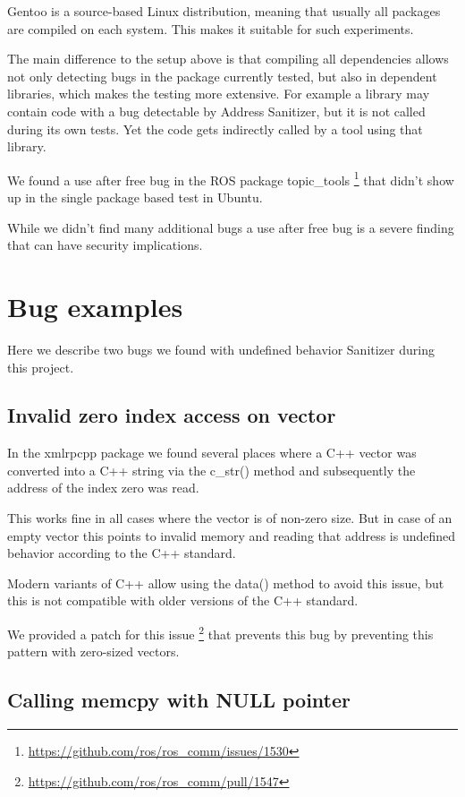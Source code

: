 \documentclass{article}
\begin{document}
Gentoo is a source-based Linux distribution, meaning that usually all packages are compiled on each system.
This makes it suitable for such experiments.

The main difference to the setup above is that compiling all dependencies allows not only detecting
bugs in the package currently tested, but also in dependent libraries, which makes the testing
more extensive. For example a library may contain
code with a bug detectable by Address Sanitizer, but it is not called during its own tests. Yet the
code gets indirectly called by a tool using that library.

We found a use after free bug in the ROS package topic\_tools
\footnote{\url{https://github.com/ros/ros_comm/issues/1530}}
that didn't show up in the
single package based test
in Ubuntu.

While we didn't find many additional bugs a use after free bug is a severe finding that can have
security implications.

\section{Bug examples}

Here we describe two bugs we found with undefined behavior Sanitizer during this project.

\subsection{Invalid zero index access on vector}

In the xmlrpcpp package we found several places where a C++ vector was converted into
a C++ string
via the c\_str() method and subsequently the address of the index zero was read.

This works fine in all cases where the vector is of non-zero size. But in case of an empty
vector this points to invalid memory and reading that address is undefined behavior according
to the C++ standard.

Modern variants of C++ allow using the data() method to avoid this issue, but this is not
compatible with older versions of the C++ standard.

We provided a patch for this issue \footnote{\url{https://github.com/ros/ros_comm/pull/1547}}
that prevents this bug by preventing this pattern with zero-sized vectors.

\subsection{Calling memcpy with NULL pointer}
\end{document}
